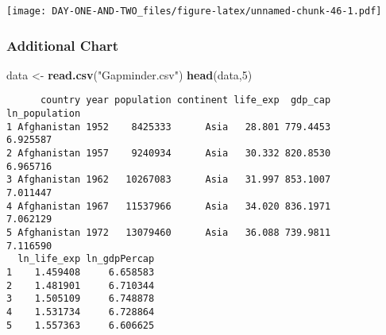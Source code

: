 \documentclass[
]{article}
\newenvironment{Shaded}{\begin{snugshade}}{\end{snugshade}}
\newcommand{\AttributeTok}[1]{\textcolor[rgb]{0.13,0.29,0.53}{#1}}
\newcommand{\DecValTok}[1]{\textcolor[rgb]{0.00,0.00,0.81}{#1}}
\newcommand{\FloatTok}[1]{\textcolor[rgb]{0.00,0.00,0.81}{#1}}
\newcommand{\FunctionTok}[1]{\textcolor[rgb]{0.13,0.29,0.53}{\textbf{#1}}}
\newcommand{\NormalTok}[1]{#1}
\newcommand{\OtherTok}[1]{\textcolor[rgb]{0.56,0.35,0.01}{#1}}
\newcommand{\SpecialCharTok}[1]{\textcolor[rgb]{0.81,0.36,0.00}{\textbf{#1}}}
\newcommand{\StringTok}[1]{\textcolor[rgb]{0.31,0.60,0.02}{#1}}
\begin{document}
\begin{Shaded}
\end{Shaded}

\texttt{[image: DAY-ONE-AND-TWO\_files/figure-latex/unnamed-chunk-46-1.pdf]}

\hypertarget{additional-chart}{%
\subsubsection{Additional Chart}\label{additional-chart}}

\begin{Shaded}
\begin{Highlighting}[]
\NormalTok{data }\OtherTok{\textless{}{-}} \FunctionTok{read.csv}\NormalTok{(}\StringTok{"Gapminder.csv"}\NormalTok{)}
\FunctionTok{head}\NormalTok{(data,}\DecValTok{5}\NormalTok{)}
\end{Highlighting}
\end{Shaded}

\begin{verbatim}
      country year population continent life_exp  gdp_cap ln_population
1 Afghanistan 1952    8425333      Asia   28.801 779.4453      6.925587
2 Afghanistan 1957    9240934      Asia   30.332 820.8530      6.965716
3 Afghanistan 1962   10267083      Asia   31.997 853.1007      7.011447
4 Afghanistan 1967   11537966      Asia   34.020 836.1971      7.062129
5 Afghanistan 1972   13079460      Asia   36.088 739.9811      7.116590
  ln_life_exp ln_gdpPercap
1    1.459408     6.658583
2    1.481901     6.710344
3    1.505109     6.748878
4    1.531734     6.728864
5    1.557363     6.606625
\end{verbatim}
\end{document}
